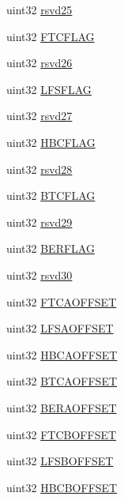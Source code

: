 \begin{DoxyCompactItemize}
\item 
uint32 \mbox{\hyperlink{structdmaBase_a5bd3d236c94b8e9155155a7d0f9f17e9}{rsvd25}}
\item 
uint32 \mbox{\hyperlink{structdmaBase_a3410b86ad513a93b0d0329fb6143142d}{F\+T\+C\+F\+L\+AG}}
\item 
uint32 \mbox{\hyperlink{structdmaBase_a72e9bac240af4837aae655752f3e5f01}{rsvd26}}
\item 
uint32 \mbox{\hyperlink{structdmaBase_a3d00d6bcccc3b7e7d96107d85892b18c}{L\+F\+S\+F\+L\+AG}}
\item 
uint32 \mbox{\hyperlink{structdmaBase_a851125fc6afea033e49ae94a18edf4d6}{rsvd27}}
\item 
uint32 \mbox{\hyperlink{structdmaBase_a8f15d3e307f0196f1dce3a8a03799d7f}{H\+B\+C\+F\+L\+AG}}
\item 
uint32 \mbox{\hyperlink{structdmaBase_a4650810426ecb23d0c35599c036b83b7}{rsvd28}}
\item 
uint32 \mbox{\hyperlink{structdmaBase_ab9bb7b468d4962751c790e7ec2845b88}{B\+T\+C\+F\+L\+AG}}
\item 
uint32 \mbox{\hyperlink{structdmaBase_a75adbc29024d96f93579ae2426c292ea}{rsvd29}}
\item 
uint32 \mbox{\hyperlink{structdmaBase_ab280d5d5042d2cab2fd4ef24674acb21}{B\+E\+R\+F\+L\+AG}}
\item 
uint32 \mbox{\hyperlink{structdmaBase_af8aa32c06c2047804800fad28ed3b9bb}{rsvd30}}
\item 
uint32 \mbox{\hyperlink{structdmaBase_afb8d236908e4b40e38dba4defc0c04db}{F\+T\+C\+A\+O\+F\+F\+S\+ET}}
\item 
uint32 \mbox{\hyperlink{structdmaBase_ae880659547959979c0c0bff95b5e5ff3}{L\+F\+S\+A\+O\+F\+F\+S\+ET}}
\item 
uint32 \mbox{\hyperlink{structdmaBase_aa0ae5c75485d45c134578e608b139eda}{H\+B\+C\+A\+O\+F\+F\+S\+ET}}
\item 
uint32 \mbox{\hyperlink{structdmaBase_a53951128e995d73ff9e1bae249f72734}{B\+T\+C\+A\+O\+F\+F\+S\+ET}}
\item 
uint32 \mbox{\hyperlink{structdmaBase_a2a032853abbbbda2d78869f4421d9b09}{B\+E\+R\+A\+O\+F\+F\+S\+ET}}
\item 
uint32 \mbox{\hyperlink{structdmaBase_a1cdd80a6d8815a765623386a097b4d6d}{F\+T\+C\+B\+O\+F\+F\+S\+ET}}
\item 
uint32 \mbox{\hyperlink{structdmaBase_a5da5b208dfb4fb99314c22f6abfc85fa}{L\+F\+S\+B\+O\+F\+F\+S\+ET}}
\item 
uint32 \mbox{\hyperlink{structdmaBase_a6ba4e8838d28cc2d83277bc0ce892ff9}{H\+B\+C\+B\+O\+F\+F\+S\+ET}}

\end{DoxyCompactItemize}
